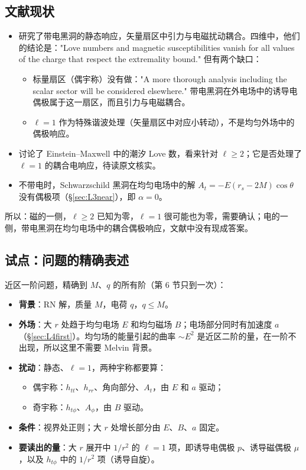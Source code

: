 \documentclass[11pt,a4paper]{ctexart}
\numberwithin{equation}{section}
\begin{document}
\subsection{文献现状}

\begin{itemize}
\item \citet{PereniguezCardoso2022} 研究了带电黑洞的静态响应，矢量扇区中引力与电磁扰动耦合。四维中，他们的结论是："Love numbers and magnetic susceptibilities vanish for all values of the charge that respect the extremality bound." 但有两个缺口：
\begin{itemize}
\item 标量扇区（偶宇称）没有做："A more thorough analysis including the scalar sector will be considered elsewhere." 带电黑洞在外电场中的诱导电偶极属于这一扇区，而且引力与电磁耦合。
\item $\ell=1$ 作为特殊谐波处理（矢量扇区中对应小转动），不是均匀外场中的偶极响应。
\end{itemize}
\item \citet{CardosoEtAl2017} 讨论了 Einstein--Maxwell 中的潮汐 Love 数，看来针对 $\ell\geq2$；它是否处理了 $\ell=1$ 的耦合电响应，待读原文核实。
\item 不带电时，Schwarzschild 黑洞在均匀电场中的解 $A_t=-E(r_s-2M)\cos\theta$ 没有偶极项（\S\ref{sec:L3near}），即 $\alpha=0$。
\end{itemize}
所以：磁的一侧，$\ell\geq2$ 已知为零，$\ell=1$ 很可能也为零，需要确认；电的一侧，带电黑洞在均匀电场中的耦合偶极响应，文献中没有现成答案。

\subsection{试点：问题的精确表述}

近区一阶问题，精确到 $M$、$q$ 的所有阶（第 6 节只到一次）：
\begin{itemize}
\item \textbf{背景}：RN 解，质量 $M$，电荷 $q$，$q\leq M$。
\item \textbf{外场}：大 $r$ 处趋于均匀电场 $E$ 和均匀磁场 $B$；电场部分同时有加速度 $a$（\S\ref{sec:L4first}）。均匀场的能量引起的曲率 $\sim E^2$ 是近区二阶的量，在一阶不出现，所以这里不需要 Melvin 背景。
\item \textbf{扰动}：静态、$\ell=1$，两种宇称都要算：
\begin{itemize}
\item 偶宇称：$h_{tt}$、$h_{rr}$、角向部分、$A_t$，由 $E$ 和 $a$ 驱动；
\item 奇宇称：$h_{t\phi}$、$A_\phi$，由 $B$ 驱动。
\end{itemize}
\item \textbf{条件}：视界处正则；大 $r$ 处增长部分由 $E$、$B$、$a$ 固定。
\item \textbf{要读出的量}：大 $r$ 展开中 $1/r^2$ 的 $\ell=1$ 项，即诱导电偶极 $p$、诱导磁偶极 $\mu$，以及 $h_{t\phi}$ 中的 $1/r^2$ 项（诱导自旋）。
\end{itemize}
\end{document}
